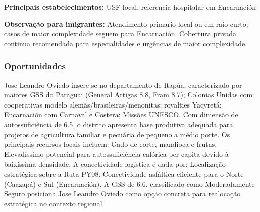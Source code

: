 \textbf{Principais estabelecimentos:} USF local; referencia hospitalar
em Encarnación

\textbf{Observação para imigrantes:} Atendimento primario local ou em
raio curto; casos de maior complexidade seguem para Encarnación.
Cobertura privada continua recomendada para especialidades e urgências
de maior complexidade.
\newpage

\subsubsection*{Oportunidades}\label{oport-jose-leandro-oviedo-0716}
Jose Leandro Oviedo insere-se no departamento de Itapúa, caracterizado por maiores GSS do Paraguai (General Artigas 8.8, Fram 8.7); Colonias Unidas com cooperativas modelo alemãs/brasileiras/menonitas; royalties Yacyretá; Encarnación com Carnaval e Costera; Missões UNESCO. Com dimensão de autossuficiência de 6.5, o distrito apresenta base produtiva adequada para projetos de agricultura familiar e pecuária de pequeno a médio porte. Os principais recursos locais incluem: Gado de corte, mandioca e frutas. Elevadíssimo potencial para autossuficiência calórica per capita devido à baixíssima densidade. A conectividade logística é dada por: Localização estratégica sobre a Ruta PY08. Conectividade asfáltica eficiente para o Norte (Caazapá) e Sul (Encarnación). A GSS de 6.6, classificado como Moderadamente Seguro posiciona Jose Leandro Oviedo como opção concreta para realocação estratégica no contexto regional.

